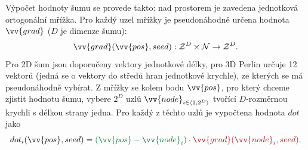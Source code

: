 Výpočet hodnoty šumu se provede takto: nad prostorem je zavedena jednotková ortogonální mřížka. Pro každý uzel mřížky je pseudonáhodně určena hodnota $\vv{grad}$ ($D$ je dimenze šumu):
\begin{equation}
	\vv{grad}(\vv{pos}, seed): \mathcal{Z}^D \times \mathcal{N} \rightarrow \mathcal{Z}^D \text{.}
\end{equation}
Pro 2D šum jsou doporučeny vektory jednotkové délky, pro 3D Perlin určuje 12 vektorů (jedná se o vektory do středů hran jednotkové krychle), ze kterých se má pseudonáhodně vybírat. Z mřížky se kolem bodu $\vv{pos}$, pro který chceme zjistit hodnotu šumu, vybere $2^D$ uzlů $\vv{node}_{i \in \langle1, 2^D\rangle}$ tvořící $D$-rozměrnou krychli s délkou strany jedna. Pro každý z těchto uzlů je vypočtena hodnota $dot$ jako
\begin{equation}
dot_i(\vv{pos}, seed) = \mathbin{\color{darkgreen}(\vv{pos} - \vv{node}_i)} \cdot \mathbin{\color{darkred}\vv{grad}(\vv{node}_i, seed)} \text{.}
\end{equation}

